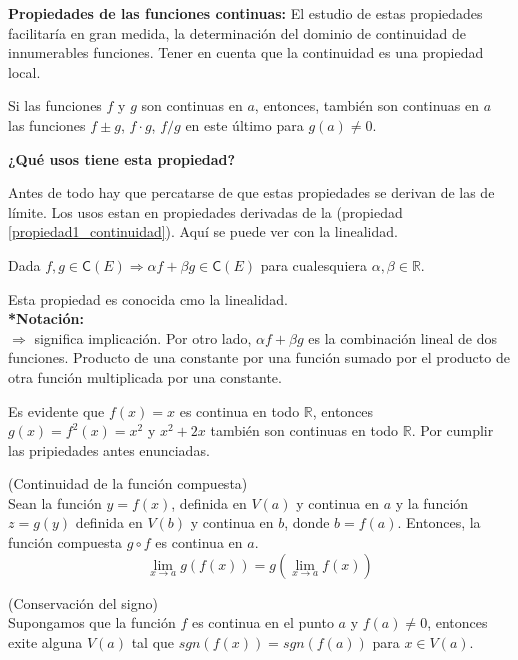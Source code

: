 \documentclass[10pt,twoside]{SelfArx} %
\begin{document}
\textbf{Propiedades de las funciones continuas:}
El estudio de estas propiedades facilitar\'ia en gran medida, la determinación del dominio de continuidad de innumerables funciones. Tener en cuenta que la continuidad es una propiedad local.
\begin{propiedad}\label{propiedad1_continuidad}
	Si las funciones $ f $ y $ g $ son continuas en $ a $, entonces, también son continuas en $ a  $ las funciones $ f\pm g $, $ f\cdot g $, $ f/g $ en este último para $ g(a)\neq0 $.
\end{propiedad}
\begin{center}
	\textbf{¿Qué usos tiene esta propiedad?}
\end{center}
Antes de todo hay que percatarse de que estas propiedades se derivan de las de límite. Los usos estan en propiedades derivadas de la (propiedad \ref{propiedad1_continuidad}). Aquí se puede ver con la linealidad.
\begin{propiedad}\label{linealidad_propiedad}
	Dada $ f,g\in\textsf{C}(E)\Rightarrow\alpha f+\beta g \in\textsf{C}(E) $ para cualesquiera $ \alpha, \beta\in\mathbb{R} $.
\end{propiedad}
Esta propiedad es conocida cmo la linealidad.\\
\textbf{*Notación:}\\
$ \Rightarrow $ significa implicación. Por otro lado, $ \alpha f+\beta g $ es la combinaci\'on lineal de dos funciones. Producto de una constante por una función sumado por el producto de otra función multiplicada por una constante.\\
\begin{ejemplo}
	Es evidente que $ f(x)=x $ es continua en todo $ \mathbb{R} $, entonces $ g(x)=f^{2}(x)=x^{2} $ y $ x^{2}+2x $ tambi\'en son continuas en todo $ \mathbb{R} $. Por cumplir las pripiedades antes enunciadas.\\
\end{ejemplo}

\begin{propiedad}
	(Continuidad de la función compuesta)\\
	Sean la función $ y=f(x) $, definida en $ V(a) $ y continua en $ a $ y la función $ z=g(y) $ definida en $ V(b) $ y continua en $ b $, donde $ b=f(a) $. Entonces, la función compuesta $ g\circ f $ es continua en $ a $.
	 \begin{equation}
	\lim\limits_{x\rightarrow a}g(f(x))=g\left  (\lim\limits_{x\rightarrow a}f(x)\right  )
	\end{equation} 
	
\end{propiedad}
\begin{propiedad}
	(Conservación del signo)\\
	Supongamos que la función $ f $ es continua en el punto $ a $ y $ f(a)\neq0 $, entonces exite alguna $ V(a) $ tal que $ sgn(f(x))=sgn(f(a)) $ para $ x\in V(a) $.
\end{propiedad}
\end{document}

